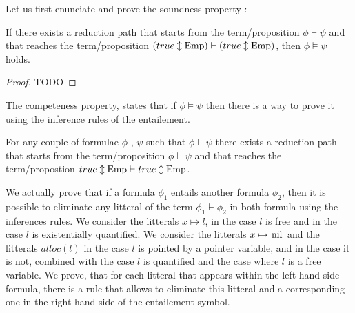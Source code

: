 \documentclass[a4paper,twoside,12pt]{report}
\newcommand{\Alloc}[1]{alloc(#1)}
\newcommand{\Emp}{\lstinline{Emp}}
\newcommand{\Pointsto}[2]{ #1 \mapsto #2}
\newcommand{\nil}[0]{\lstinline!nil!}
\newcommand{\Pointstonil}[1]{ #1 \mapsto \mbox{\nil}}
\newcommand{\Formula}[2]{ #1  \updownarrow #2}
\newcommand{\NForm}[1]{\mathcal{NF}(#1)}
\newcommand{\true}{true}
\begin{document}
Let us first enunciate and prove the soundness property :

\begin{theorem}[Soundness]
\label{th:soundness}
If there exists a reduction path that starts from the term/proposition $\phi \vdash \psi$ and that reaches the term/proposition $(\Formula{\true}{\Emp}) \vdash( \Formula{\true}{\Emp})$, then $\phi \models \psi$ holds.
\end{theorem}
\begin{proof}
TODO
\end{proof}


%
%

The competeness property, states that if $\phi \models \psi$ then there is
a way to prove it using the inference rules of the entailement.


\begin{theorem}[Completeness]
\label{th:completeness}
For any couple of formulae $\phi$ , $\psi$ such that $\phi \models \psi$
there exists a reduction path that starts from the term/proposition $\phi \vdash \psi$ and that reaches the term/propostion $\Formula{\true}{\Emp} \vdash \Formula{\true}{\Emp}$.
\end{theorem}
We actually prove that if a formula $\phi_1$ entails another formula $\phi_2$, then it is possible to eliminate any litteral of the term $\phi_1 \vdash \phi_2$ in both formula using the inferences rules.
We consider the litterals $\Pointsto{x}{l}$, in the case $l$ is free and in the case $l$ is existentially quantified. We consider the litterals $\Pointstonil{x}$ and the litterals $\Alloc{l}$ in the case $l$ is pointed by a pointer variable, and in the case it is not, combined with the case $l$ is quantified and the case
where $l$ is a free variable.
We prove, that for each litteral  that appears within  the left hand side formula, there is a rule that allows to eliminate this litteral and a corresponding one
in the right hand side of the entailement symbol.
\end{document}
